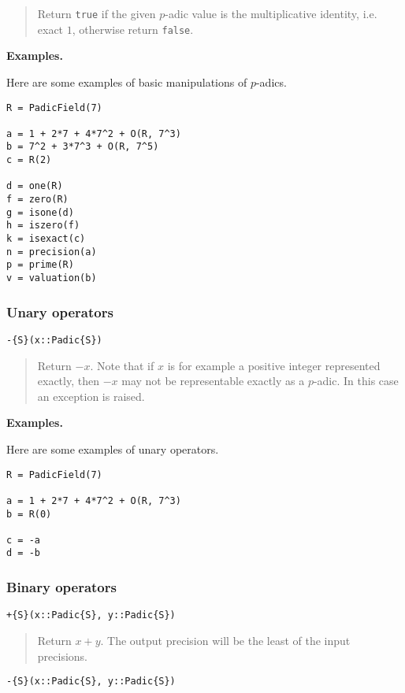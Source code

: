 \documentclass[a4paper,10pt]{article}
\newcommand{\code}{\lstinline}
\newcommand{\desc}[1]{\vspace{-3mm}\begin{quote}#1\end{quote}}
\begin{document}
{{{\desc{Return \code{true} if the given $p$-adic value is the multiplicative
identity, i.e. exact $1$, otherwise return \code{false}.}

\textbf{Examples.}

Here are some examples of basic manipulations of $p$-adics.

\begin{lstlisting}
R = PadicField(7)

a = 1 + 2*7 + 4*7^2 + O(R, 7^3)
b = 7^2 + 3*7^3 + O(R, 7^5)
c = R(2)

d = one(R)
f = zero(R)
g = isone(d)
h = iszero(f)
k = isexact(c)
n = precision(a)
p = prime(R)
v = valuation(b)
\end{lstlisting}

\subsubsection{Unary operators}

\begin{lstlisting}
-{S}(x::Padic{S})
\end{lstlisting}

\desc{Return $-x$. Note that if $x$ is for example a positive integer
represented exactly, then $-x$ may not be representable exactly as a $p$-adic.
In this case an exception is raised.}

\textbf{Examples.}

Here are some examples of unary operators.

\begin{lstlisting}
R = PadicField(7)

a = 1 + 2*7 + 4*7^2 + O(R, 7^3)
b = R(0)

c = -a
d = -b
\end{lstlisting}

\subsubsection{Binary operators}

\begin{lstlisting}
+{S}(x::Padic{S}, y::Padic{S})
\end{lstlisting}

\desc{Return $x + y$. The output precision will be the least of the input
precisions.}

\begin{lstlisting}
-{S}(x::Padic{S}, y::Padic{S})
\end{lstlisting}

}}}
\end{document}
